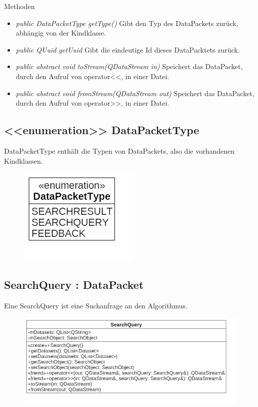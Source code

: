 Methoden
\begin{itemize}
\item \textit{public DataPacketType getType()} Gibt den Typ des DataPackets zurück, abhängig von der Kindklasse.
\item\textit{public QUuid getUuid} Gibt die eindeutige Id dieses DataPacktets zurück.
\item \textit{public abstract void toStream(QDataStream in)} Speichert das DataPacket, durch den Aufruf von operator<<, in einer Datei.
\item \textit{public abstract void fromStream(QDataStream out)} Speichert das DataPacket, durch den Aufruf von operator>>, in einer Datei.
\end{itemize}

\subsection*{<<enumeration>> DataPacketType}
DataPacketType enthält die Typen von DataPackets, also die vorhandenen Kindklassen.

\begin{figure}[H]
\centering
\includegraphics[scale=0.5]{img/Klassendiagramm/Klassen/DataPacketType}
\label{fig:dataPacketType}
\end{figure}

\subsection*{SearchQuery : DataPacket}
Eine SearchQuery ist eine Suchanfrage an den Algorithmus.

\begin{figure}[H]
\centering
\includegraphics[scale=0.5]{img/Klassendiagramm/Klassen/SearchQuery}
\label{fig:searchQuery}
\end{figure}

